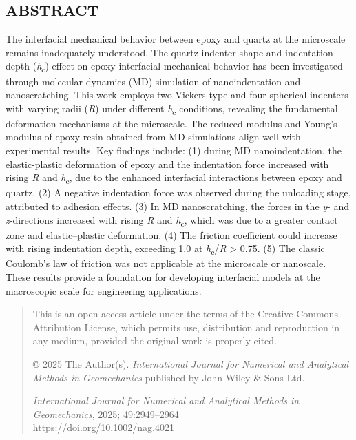\documentclass{article}
\begin{document}
\subsection*{ABSTRACT}
The interfacial mechanical behavior between epoxy and quartz at the microscale remains inadequately understood. The quartz-indenter shape and indentation depth (\emph{h}\textsubscript{c}) effect on epoxy interfacial mechanical behavior has been investigated through molecular dynamics (MD) simulation of nanoindentation and nanoscratching. This work employs two Vickers-type and four spherical indenters with varying radii (\emph{R}) under different \emph{h}\textsubscript{c} conditions, revealing the fundamental deformation mechanisms at the microscale. The reduced modulus and Young’s modulus of epoxy resin obtained from MD simulations align well with experimental results. Key findings include: (1) during MD nanoindentation, the elastic-plastic deformation of epoxy and the indentation force increased with rising \emph{R} and \emph{h}\textsubscript{c}, due to the enhanced interfacial interactions between epoxy and quartz. (2) A negative indentation force was observed during the unloading stage, attributed to adhesion effects. (3) In MD nanoscratching, the forces in the \emph{y}- and \emph{z}-directions increased with rising \emph{R} and \emph{h}\textsubscript{c}, which was due to a greater contact zone and elastic–plastic deformation. (4) The friction coefficient could increase with rising indentation depth, exceeding 1.0 at \emph{h}\textsubscript{c}/\emph{R} > 0.75. (5) The classic Coulomb’s law of friction was not applicable at the microscale or nanoscale. These results provide a foundation for developing interfacial models at the macroscopic scale for engineering applications.

\begin{quote}\footnotesize
\noindent This is an open access article under the terms of the Creative Commons Attribution License, which permits use, distribution and reproduction in any medium, provided the original work is properly cited.

\noindent © 2025 The Author(s). \emph{International Journal for Numerical and Analytical Methods in Geomechanics} published by John Wiley \& Sons Ltd.

\noindent \emph{International Journal for Numerical and Analytical Methods in Geomechanics}, 2025; 49:2949–2964\\
https://doi.org/10.1002/nag.4021
\end{quote}
\end{document}
